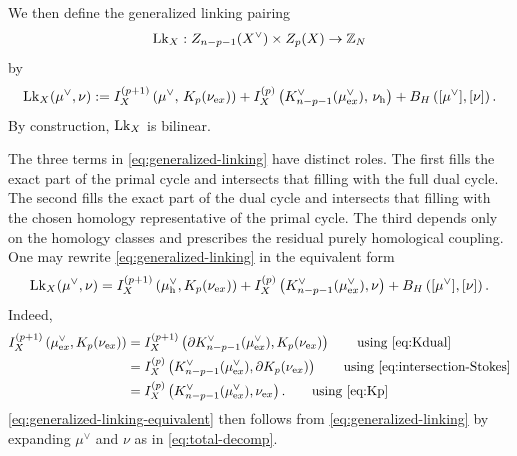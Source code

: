 We then define the generalized linking pairing
\begin{equation}
	\mathrm{Lk}_X:
	Z_{n-p-1}(X^\vee)\times Z_p(X)\rightarrow \mathbb Z_N
	\label{eq:L-map}
\end{equation}
by
\begin{equation}
	\mathrm{Lk}_X(\mu^\vee,\nu)
	:=
	I_X^{(p+1)}\left(\mu^\vee,\,K_p(\nu_{\mathrm ex})\right)
	+
	I_X^{(p)}\left(K^\vee_{n-p-1}(\mu^\vee_{\mathrm ex}),\,\nu_{\mathrm h}\right)
	+
	B_H\left([\mu^\vee],[\nu]\right).
	\label{eq:generalized-linking}
\end{equation}
By construction, \(\mathrm{Lk}_X\) is bilinear.

The three terms in \eqref{eq:generalized-linking} have distinct roles. The first fills
the exact part of the primal cycle and intersects that filling with the full dual cycle.
The second fills the exact part of the dual cycle and intersects that filling with the
chosen homology representative of the primal cycle. The third depends only on the homology
classes and prescribes the residual purely homological coupling. One may rewrite
\eqref{eq:generalized-linking} in the equivalent form
\begin{equation}
	\mathrm{Lk}_X(\mu^\vee,\nu)
	=
	I_X^{(p+1)}\left(\mu^\vee_{\mathrm h},K_p(\nu_{\mathrm ex})\right)
	+
	I_X^{(p)}\left(K^\vee_{n-p-1}(\mu^\vee_{\mathrm ex}),\nu\right)
	+
	B_H\left([\mu^\vee],[\nu]\right).
	\label{eq:generalized-linking-equivalent}
\end{equation}
Indeed,
\begin{equation}
\begin{aligned}
	I_X^{(p+1)}\left(\mu^\vee_{\mathrm ex},K_p(\nu_{\mathrm ex})\right)
	&=
	I_X^{(p+1)}\left(\partial K^\vee_{n-p-1}(\mu^\vee_{\mathrm ex}),K_p(\nu_{\mathrm ex})\right)
	\qquad \text{using \eqref{eq:Kdual}}
	\\
	&=
	I_X^{(p)}\left(K^\vee_{n-p-1}(\mu^\vee_{\mathrm ex}),\partial K_p(\nu_{\mathrm ex})\right)
	\qquad \text{using \eqref{eq:intersection-Stokes}}
	\\
	&=
	I_X^{(p)}\left(K^\vee_{n-p-1}(\mu^\vee_{\mathrm ex}),\nu_{\mathrm ex}\right).
	\qquad \text{using \eqref{eq:Kp}}
\end{aligned}
\end{equation}
\eqref{eq:generalized-linking-equivalent} then follows from \eqref{eq:generalized-linking} by expanding $\mu^\vee$ and $\nu$ as in \eqref{eq:total-decomp}.

